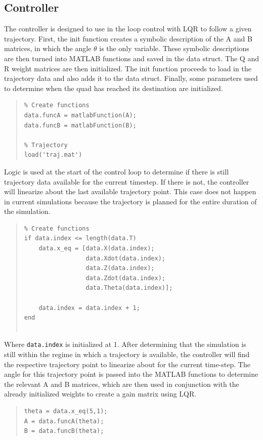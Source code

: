 \documentclass[12pt]{article}
\begin{document}
\subsection{Controller}
The controller is designed to use in the loop control with LQR to follow a given trajectory. First, the init function creates a symbolic description of the A and B matrices, in which the angle $\theta$ is the only variable.  These symbolic descriptions are then turned into MATLAB functions and saved in the data struct.  The Q and R weight matrices are then initialized.  The init function proceeds to load in the trajectory data and also adds it to the data struct.  Finally, some parameters used to determine when the quad has reached its destination are initialized.
\begin{quote}
\begin{lstlisting}
% Create functions
data.funcA = matlabFunction(A);
data.funcB = matlabFunction(B);

% Trajectory
load('traj.mat')
\end{lstlisting}
\end{quote}

Logic is used at the start of the control loop to determine if there is still trajectory data available for the current timestep.  If there is not, the controller will linearize about the last available trajectory point.  This case does not happen in current simulations because the trajectory is planned for the entire duration of the simulation.
\begin{quote}
\begin{lstlisting}
% Create functions
if data.index <= length(data.T)
    data.x_eq = [data.X(data.index);
                 data.Xdot(data.index);
                 data.Z(data.index);
                 data.Zdot(data.index);
                 data.Theta(data.index)];
             
    data.index = data.index + 1;
end


\end{lstlisting}
\end{quote}
Where \lstinline!data.index! is initialized at 1. 
\newline
\newline
After determining that the simulation is still within the regime in which a trajectory is available, the controller will find the respective trajectory point to linearize about for the current time-step.  The angle for this trajectory point is passed into the MATLAB functions to determine the relevant A and B matrices, which are then used in conjunction with the already initialized weights to create a gain matrix using LQR.
\begin{quote}
\begin{lstlisting}
theta = data.x_eq(5,1);
A = data.funcA(theta);
B = data.funcB(theta);

\end{lstlisting}
\end{quote}
\end{document}
